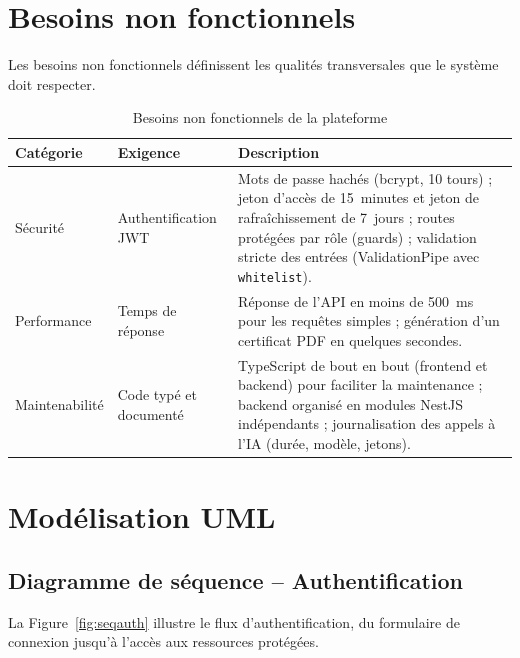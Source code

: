 \documentclass[12pt,a4paper,oneside,openany]{report}
\begin{document}
\section{Besoins non fonctionnels}

Les besoins non fonctionnels définissent les qualités transversales que le système doit respecter.

\begin{table}[H]
\centering
\caption{Besoins non fonctionnels de la plateforme}
\begin{tabular}{|p{2.6cm}|p{4.2cm}|p{6.2cm}|}
\hline
\textbf{Catégorie} & \textbf{Exigence} & \textbf{Description} \\
\hline
Sécurité & Authentification JWT & Mots de passe hachés (bcrypt, 10 tours) ; jeton d'accès de 15~minutes et jeton de rafraîchissement de 7~jours ; routes protégées par rôle (guards) ; validation stricte des entrées (ValidationPipe avec \texttt{whitelist}). \\
\hline
Performance & Temps de réponse & Réponse de l'API en moins de 500~ms pour les requêtes simples ; génération d'un certificat PDF en quelques secondes. \\
\hline
Maintenabilité & Code typé et documenté & TypeScript de bout en bout (frontend et backend) pour faciliter la maintenance ; backend organisé en modules NestJS indépendants ; journalisation des appels à l'IA (durée, modèle, jetons). \\
\hline
\end{tabular}
\end{table}

\section{Modélisation UML}

\subsection{Diagramme de séquence -- Authentification}

La Figure~\ref{fig:seqauth} illustre le flux d'authentification, du formulaire de connexion jusqu'à l'accès aux ressources protégées.
\end{document}
